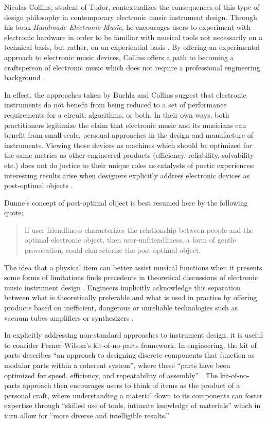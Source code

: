 Nicolas Collins, student of Tudor, contextualizes the consequences of this type of design philosophy in contemporary electronic music instrument design. Through his book \emph{Handmade Electronic Music}, he encourages users to experiment with electronic hardware in order to be familiar with musical tools not necessarily on a technical basis, but rather, on an experiential basis \citep{collins2006}. By offering an experimental approach to electronic music devices, Collins offers a path to becoming a craftsperson of electronic music which does not require a professional engineering background \citep{collins2006,collins2008}. 

In effect, the approaches taken by Buchla and Collins suggest that electronic instruments do not benefit from being reduced to a set of performance requirements for a circuit, algorithms, or both. In their own ways, both practitioners legitimize the claim that electronic music and its musicians can benefit from small-scale, personal approaches in the design and manufacture of instruments. Viewing those devices as machines which should be optimized for the same metrics as other engineered products (efficiency, reliability, solvability etc.) does not do justice to their unique roles as catalysts of poetic experiences: interesting results arise when designers explicitly address electronic devices as post-optimal objects \citep{dunne2005}.  

Dunne's concept of post-optimal object is best resumed here by the following quote: 

\begin{quote}
	If user-friendliness characterizes the relationship between people and the optimal electronic object, then user-unfriendliness, a form of gentle provocation, could characterize the post-optimal object. 
\end{quote}

\citep[p.xviii]{dunne2005}

The idea that a physical item can better assist musical functions when it presents some forms of limitations finds precedents in theoretical discussions of electronic music instrument design \citep{evens2005,rovan2009}. Engineers implicitly acknowledge this separation between what is theoretically preferable and what is used in practice by offering products based on inefficient, dangerous or unreliable technologies such as vacuum tubes amplifiers or synthesizers \citep{barbour1998,hamm1973}. 

In explicitly addressing non-standard approaches to instrument design, it is useful to consider Perner-Wilson's kit-of-no-parts framework. In engineering, the kit of parts describes ``an approach to designing discrete components that function as modular parts within a coherent system'', where these ``parts have been optimized for speed, efficiency, and repeatability of assembly'' . The kit-of-no-parts approach then encourages users to think of items as the product of a personal craft, where understanding a material down to its components can foster expertise through ``skilled use of tools, intimate knowledge of materials'' which in turn allow for ``more diverse and intelligible results.''\citep{perner2011}

